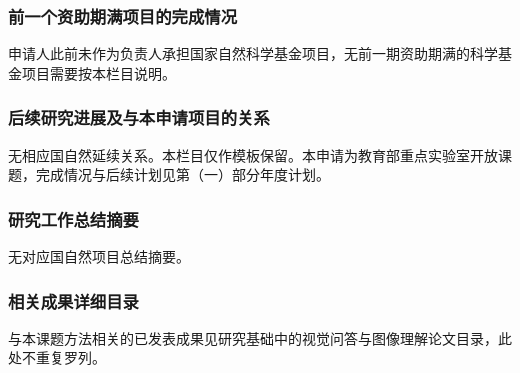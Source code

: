 \justifying
\NSFCBodyText

\subsubsection{前一个资助期满项目的完成情况}

申请人此前未作为负责人承担国家自然科学基金项目，无前一期资助期满的科学基金项目需要按本栏目说明。

\subsubsection{后续研究进展及与本申请项目的关系}

无相应国自然延续关系。本栏目仅作模板保留。本申请为教育部重点实验室开放课题，完成情况与后续计划见第（一）部分年度计划。

\subsubsection{研究工作总结摘要}

无对应国自然项目总结摘要。

\subsubsection{相关成果详细目录}

与本课题方法相关的已发表成果见研究基础中的视觉问答与图像理解论文目录，此处不重复罗列。
